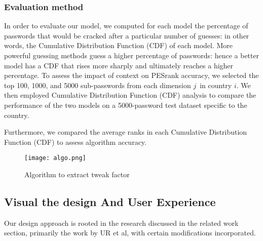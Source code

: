 \documentclass[5p,twocolumn]{elsarticle}
\begin{document}
\subsubsection{\textbf{Evaluation method}} 
In order to evaluate our model, we computed for each model the percentage of passwords that would be cracked after a particular number of guesses: in other words, the Cumulative Distribution Function (CDF) of each model. More powerful guessing methods guess a higher percentage of passwords: hence a better model has a CDF that rises more sharply and ultimately reaches a higher percentage.
To assess the impact of context on PESrank accuracy, we selected the top 100, 1000, and 5000 sub-passwords from each dimension \(j\)\ in country \( i\). We then employed Cumulative Distribution Function (CDF) analysis to compare the performance of the two models on a 5000-password test dataset specific to the country. 

Furthermore, we compared the average ranks in each Cumulative Distribution Function (CDF) to assess algorithm accuracy.

\begin{figure}
	\centering 
	\texttt{[image: algo.png]}
 \caption{Algorithm to extract tweak factor}
	\label{fig_mom0}%
\end{figure}
\subsection{\textbf{Visual the design And User Experience}}
Our design approach is rooted in the research discussed in the related work section, primarily the work by UR et al, with certain modifications incorporated.
\end{document}
